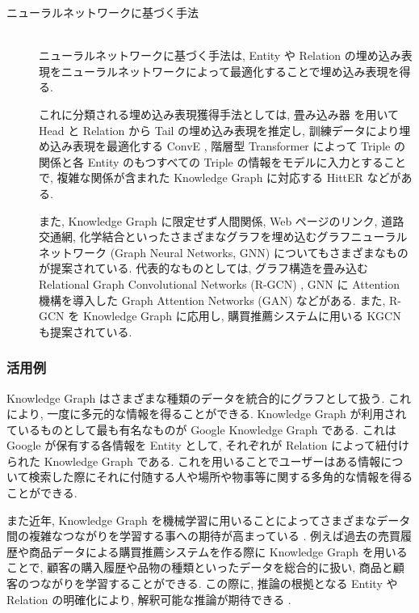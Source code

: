 \begin{description}
   \item[ニューラルネットワークに基づく手法]\mbox{}\\
	\quad ニューラルネットワークに基づく手法は, Entity や Relation の埋め込み表現をニューラルネットワークによって最適化することで埋め込み表現を得る. \par
    \quad これに分類される埋め込み表現獲得手法としては, 畳み込み器 \cite{Convolutional} を用いて Head と Relation から Tail の埋め込み表現を推定し, 訓練データにより埋め込み表現を最適化する ConvE \cite{WN18RR_ConvE}, 階層型 Transformer によって Triple の関係と各 Entity のもつすべての Triple の情報をモデルに入力とすることで, 複雑な関係が含まれた Knowledge Graph に対応する HittER \cite{HittER} などがある. \par
    \quad また, Knowledge Graph に限定せず人間関係, Web ページのリンク, 道路交通網, 化学結合といったさまざまなグラフを埋め込むグラフニューラルネットワーク (Graph Neural Networks, GNN) \cite{GNN} についてもさまざまなものが提案されている. 代表的なものとしては, グラフ構造を畳み込む Relational Graph Convolutional Networks (R-GCN) \cite{R-GCN}, GNN に Attention 機構を導入した Graph Attention Networks (GAN) \cite{GAN} などがある. また, R-GCN を Knowledge Graph に応用し, 購買推薦システムに用いる KGCN \cite{KGCN} も提案されている. \par
\end{description}

\subsubsection{活用例}

Knowledge Graph はさまざまな種類のデータを統合的にグラフとして扱う. これにより, 一度に多元的な情報を得ることができる. Knowledge Graph が利用されているものとして最も有名なものが Google Knowledge Graph である. これは Google が保有する各情報を Entity として, それぞれが Relation によって紐付けられた Knowledge Graph である. これを用いることでユーザーはある情報について検索した際にそれに付随する人や場所や物事等に関する多角的な情報を得ることができる. \par
また近年, Knowledge Graph を機械学習に用いることによってさまざまなデータ間の複雑なつながりを学習する事への期待が高まっている \cite{recommend_system}. 例えば過去の売買履歴や商品データによる購買推薦システムを作る際に Knowledge Graph を用いることで, 顧客の購入履歴や品物の種類といったデータを総合的に扱い, 商品と顧客のつながりを学習することができる. この際に, 推論の根拠となる Entity や Relation の明確化により, 解釈可能な推論が期待できる \cite{KGCN} \cite{recommendation}. \par

